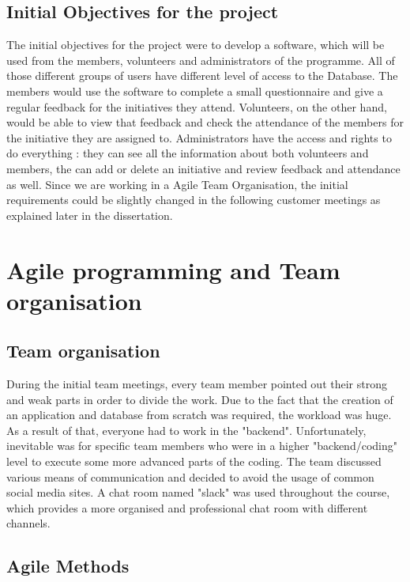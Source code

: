 \documentclass{l3proj}
\begin{document}
\subsection{Initial Objectives for the project}
\label{objectives}

The initial objectives for the project were to develop a software, which will be used from the members, volunteers and administrators of the programme. All of those different groups of users have different level of access to the Database. The members would use the software to  complete a small questionnaire and give a regular feedback for the initiatives they attend. Volunteers, on the other hand, would be able to view that feedback and check the attendance of the members for the initiative they are assigned to. Administrators have the access and rights to do everything : they can see all the information about both volunteers and members, the can add or delete an initiative and review feedback and attendance as well. Since we are working in a Agile Team Organisation, the initial requirements could be slightly changed in the following customer meetings as explained later in the dissertation.

\section{Agile programming and Team organisation}

\subsection{Team organisation}
\label{organisation}

During the initial team meetings, every team member pointed out their strong and weak parts in order to divide the work. Due to the fact that the creation of an application and database from scratch was required, the workload was huge. As a result of that, everyone had to work in the "backend". Unfortunately, inevitable was for specific team members who were in a higher "backend/coding" level to execute some more advanced parts of the coding.
The team discussed various means of communication and decided to avoid the usage of common social media sites. A chat room named "slack" was used throughout the course, which provides a more organised and professional chat room with different channels.

\subsection{Agile Methods}
\label{agile}
\end{document}

